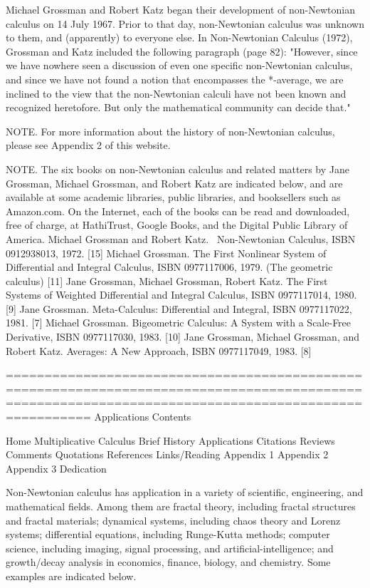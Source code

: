 \documentclass[12pt]{article}
\begin{document}
Michael Grossman and Robert Katz began their development of non-Newtonian calculus on 14 July 1967. Prior to that day, non-Newtonian calculus was unknown to them, and (apparently) to everyone else. In Non-Newtonian Calculus (1972), Grossman and Katz included the following paragraph (page 82):
"However, since we have nowhere seen a discussion of even one specific non-Newtonian calculus, and since we have not found a notion that encompasses the *-average, we are inclined to the view that the non-Newtonian calculi have not been known and recognized heretofore. But only the mathematical community can decide that."



NOTE. For more information about the history of non-Newtonian calculus, please see Appendix 2 of this website.

NOTE. The six books on non-Newtonian calculus and related matters by Jane Grossman, Michael Grossman, and Robert Katz are indicated below, and are available at some academic libraries, public libraries, and booksellers such as Amazon.com. On the Internet, each of the books can be read and downloaded, free of charge, at HathiTrust, Google Books, and the Digital Public Library of America.
Michael Grossman and Robert Katz.  Non-Newtonian Calculus, ISBN 0912938013, 1972. [15] 
Michael Grossman. The First Nonlinear System of Differential and Integral Calculus, ISBN 0977117006, 1979. (The geometric calculus) [11] 
Jane Grossman, Michael Grossman, Robert Katz. The First Systems of Weighted Differential and Integral Calculus, ISBN 0977117014, 1980. [9]
Jane Grossman. Meta-Calculus: Differential and Integral, ISBN 0977117022, 1981. [7]
Michael Grossman. Bigeometric Calculus: A System with a Scale-Free Derivative, ISBN 0977117030, 1983. [10]
Jane Grossman, Michael Grossman, and Robert Katz. Averages: A New Approach, ISBN 0977117049, 1983. [8]

=====================================================================================================================================================
Applications
Contents

Home
Multiplicative Calculus
Brief History
Applications
Citations
Reviews
Comments
Quotations
References
Links/Reading
Appendix 1
Appendix 2
Appendix 3
Dedication


Non-Newtonian calculus has application in a variety of scientific, engineering, and mathematical fields. Among them are fractal theory, including fractal structures and fractal materials; dynamical systems, including chaos theory and Lorenz systems; differential equations, including Runge-Kutta methods; computer science, including imaging, signal processing, and artificial-intelligence; and growth/decay analysis in economics, finance, biology, and chemistry. Some examples are indicated below.
\end{document}
